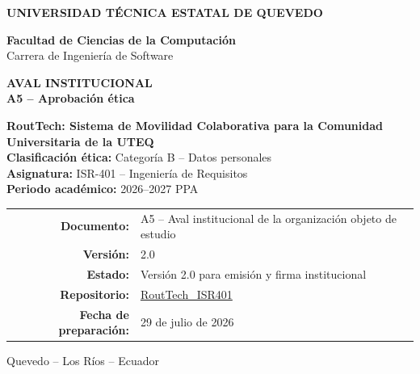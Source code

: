 \documentclass[11pt,a4paper]{article}
\newcommand{\Proyecto}{RoutTech: Sistema de Movilidad Colaborativa para la Comunidad Universitaria de la UTEQ}
\newcommand{\Asignatura}{ISR-401 -- Ingeniería de Requisitos}
\newcommand{\Periodo}{2026--2027 PPA}
\newcommand{\CategoriaEtica}{Categoría B -- Datos personales}
\newcommand{\Repositorio}{https://github.com/AnderJM3/RoutTech_ISR401}
\newcommand{\FechaDocumento}{29 de julio de 2026}
\newcommand{\VersionDocumento}{2.0}
\newcommand{\EstadoDocumento}{Versión 2.0 para emisión y firma institucional}
\begin{document}
\justifying

\thispagestyle{empty}

\vspace*{0.65cm}
\begin{center}
{\color{white}\Large\bfseries UNIVERSIDAD TÉCNICA ESTATAL DE QUEVEDO}

\vspace{1.75cm}
{\large\bfseries\color{RTForest} Facultad de Ciencias de la Computación\\[4pt]}
{\normalsize\color{RTGray} Carrera de Ingeniería de Software}

\vspace{0.85cm}

{\Huge\bfseries\color{RTForest} AVAL INSTITUCIONAL\\[8pt]}
{\Large\bfseries\color{RTTerracotta} A5 -- Aprobación ética}

\vspace{1.0cm}

\begin{tcolorbox}[width=0.90\textwidth,colback=RTCream,colframe=RTGold,boxrule=1pt,arc=2mm]
\centering
{\large\bfseries \Proyecto}\\[7pt]
\textbf{Clasificación ética:} \CategoriaEtica\\
\textbf{Asignatura:} \Asignatura\\
\textbf{Periodo académico:} \Periodo
\end{tcolorbox}

\vfill
\begin{tabular}{rl}
\textbf{Documento:} & A5 -- Aval institucional de la organización objeto de estudio\\
\textbf{Versión:} & \VersionDocumento\\
\textbf{Estado:} & \EstadoDocumento\\
\textbf{Repositorio:} & \href{\Repositorio}{RoutTech\_ISR401}\\
\textbf{Fecha de preparación:} & \FechaDocumento
\end{tabular}

\vspace{0.75cm}
{\small Quevedo -- Los Ríos -- Ecuador}
\end{center}
\clearpage
\end{document}
